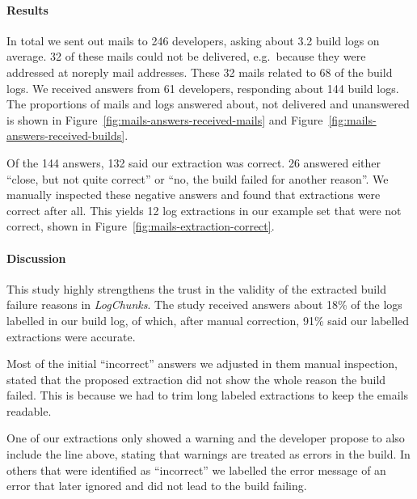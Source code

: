 \documentclass[\myrootdir/main.tex]{subfiles}
\begin{document}
\paragraph{Results}
In total we sent out mails to 246 developers, asking about 3.2 build logs on average.
32 of these mails could not be delivered, e.g.\ because they were addressed at noreply mail addresses.
These 32 mails related to 68 of the build logs.
We received answers from 61 developers, responding about 144 build logs.
The proportions of mails and logs answered about, not delivered and unanswered is shown in Figure~\ref{fig:mails-answers-received-mails} and Figure~\ref{fig:mails-answers-received-builds}.

Of the 144 answers, 132 said our extraction was correct.
26 answered either ``close, but not quite correct'' or ``no, the build failed for another reason''.
We manually inspected these negative answers and found that extractions were correct after all.
This yields 12 log extractions in our example set that were not correct, shown in Figure~\ref{fig:mails-extraction-correct}.

\paragraph{Discussion}
This study highly strengthens the trust in the validity of the extracted build failure reasons in \emph{LogChunks}.
The study received answers about 18\% of the logs labelled in our build log, of which, after manual correction, 91\% said our labelled extractions were accurate.

Most of the initial ``incorrect'' answers we adjusted in them manual inspection, stated that the proposed extraction did not show the whole reason the build failed.
This is because we had to trim long labeled extractions to keep the emails readable.

One of our extractions only showed a warning and the developer propose to also include the line above, stating that warnings are treated as errors in the build.
In others that were identified as ``incorrect'' we labelled the error message of an error that later ignored and did not lead to the build failing.
\end{document}
